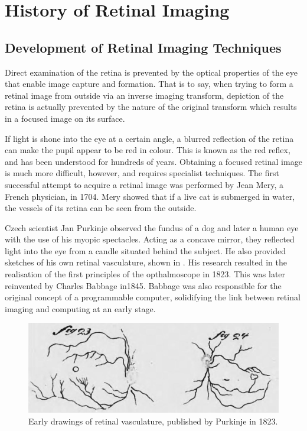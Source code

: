
\chapter{History of Retinal Imaging}

\label{history_retinal_imaging}


\section{Development of Retinal Imaging Techniques}

Direct examination of the retina is prevented by the optical properties of the
eye that enable image capture and formation.  That is to say, when trying to
form a retinal image from outside via an inverse imaging transform, depiction
of the retina is actually prevented by the nature of the original transform which
results in a focused image on its surface.

If light is shone into the eye at a certain angle, a blurred reflection of the
retina can make the pupil appear to be red in colour.  This is known as
the red reflex, and has been understood for hundreds of years.  Obtaining
a focused retinal image is much more difficult, however, and requires
specialist techniques. The first successful attempt to acquire a retinal
image was performed by Jean Mery, a French physician, in 1704.
\cite{valsalva1704aure}  Mery  showed that if a live cat is submerged in
water, the vessels of its retina can be seen from the outside.
\cite{collegeoptometrists}

Czech scientist Jan Purkinje observed the fundus of a dog and later a
human eye with the use of his myopic spectacles.  Acting as a concave
mirror, they reflected light into the eye from a candle situated behind the
subject.  He also provided sketches of his own retinal vasculature, shown
in . His research resulted in the realisation of the
first principles of the opthalmoscope in 1823.  This was later reinvented
by Charles Babbage in1845. \cite{flick1947centenary,keeler1997150}
Babbage was also responsible for the original concept of a programmable
computer, solidifying the link between retinal imaging and computing at an
early stage.\cite{halacy1970charles}

\begin{figure}[htbp]
\centering
  \includegraphics{figures/retinal_vasc_drawings}
\caption{Early drawings of retinal vasculature, published by Purkinje in 1823.\cite{purkinjeje}}
\label{fig:retinal_drawings}
\end{figure}

